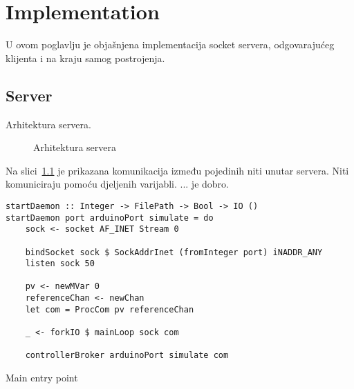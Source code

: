 \newpage
\chapter{Implementation}

U ovom poglavlju je objašnjena implementacija socket servera, odgovarajućeg
klijenta i na kraju samog postrojenja.

\newpage
\section{Server}

Arhitektura servera.

\begin{figure}[h]
\centering
{}
\caption{Arhitektura servera}
\label{fig:architecture}
\end{figure}

Na slici~\ref{fig:architecture} je prikazana komunikacija između pojedinih niti
unutar servera. Niti komuniciraju pomoću djeljenih varijabli.
... je dobro.

\begin{listing}[H]
\centering
\begin{verbatim}
startDaemon :: Integer -> FilePath -> Bool -> IO ()
startDaemon port arduinoPort simulate = do
    sock <- socket AF_INET Stream 0

    bindSocket sock $ SockAddrInet (fromInteger port) iNADDR_ANY
    listen sock 50

    pv <- newMVar 0
    referenceChan <- newChan
    let com = ProcCom pv referenceChan

    _ <- forkIO $ mainLoop sock com

    controllerBroker arduinoPort simulate com
\end{verbatim}
\caption{Main entry point}
\label{lst:main}
\end{listing}


